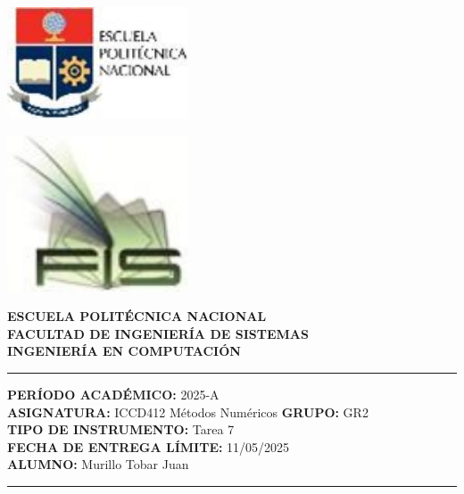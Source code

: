 \documentclass[12pt]{article}
\begin{document}
\begin{minipage}{0.45\textwidth}
    \includegraphics[width=0.4\textwidth]{inFiles/Figures/epnLogo.jpg}
\end{minipage}
\hfill
\begin{minipage}{0.45\textwidth}
    \raggedleft
    \includegraphics[width=0.4\textwidth]{inFiles/Figures/FIS_logo.jpg}
\end{minipage}

\vspace{0.5cm}

\begin{center}
    \textbf{ESCUELA POLITÉCNICA NACIONAL}\\[0.2cm]
    \textbf{FACULTAD DE INGENIERÍA DE SISTEMAS}\\[0.2cm]
    \textbf{INGENIERÍA {\textbf{EN COMPUTACIÓN}}}
\end{center}

\vspace{0.5cm}
\hrule
\vspace{0.5cm}

\noindent\textbf{PERÍODO ACADÉMICO:} 2025-A\\[0.2cm]
\noindent\textbf{ASIGNATURA:} ICCD412 Métodos Numéricos \hfill \textbf{GRUPO:} GR2\\[0.2cm]
\noindent\textbf{TIPO DE INSTRUMENTO:} Tarea 7\\[0.2cm]
\noindent\textbf{FECHA DE ENTREGA LÍMITE:} 11/05/2025\\[0.2cm]
\noindent\textbf{ALUMNO:} Murillo Tobar Juan

\vspace{0.5cm}
\hrule
\vspace{1cm}
\end{document}
